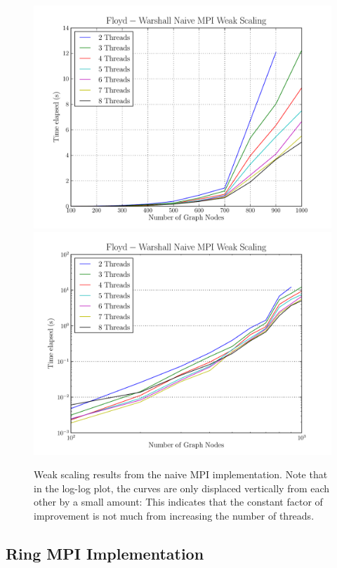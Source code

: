 \documentclass[12pt]{article}
\begin{document}
\begin{figure}[h!]
  \centering
  \includegraphics[scale=0.7]{../profiling/naive/naive_linear_weak.pdf}
  \includegraphics[scale=0.7]{../profiling/naive/naive_log_weak.pdf}
  \caption{Weak scaling results from the naive MPI implementation. Note that
    in the log-log plot, the curves are only displaced vertically from each
    other by a small amount:  This indicates that the constant factor of
    improvement is not much from increasing the number of threads.}
\end{figure}

\subsection*{Ring MPI Implementation}
\end{document}
